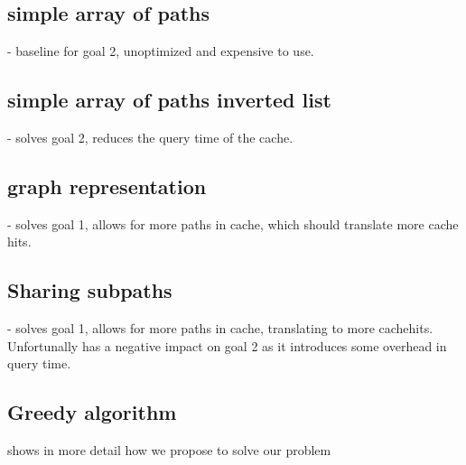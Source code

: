 \subsection{simple array of paths} - baseline for goal 2, unoptimized and expensive to use.

\subsection{simple array of paths inverted list} - solves goal 2, reduces the query time of the cache.

\subsection{graph representation} - solves goal 1, allows for more paths in cache, which should translate more cache hits.

\subsection{Sharing subpaths} - solves goal 1, allows for more paths in cache, translating to more cachehits. Unfortunally has a negative impact on goal 2 as it introduces some overhead in query time.


\subsection{Greedy algorithm}
shows in more detail how we propose to solve our problem

